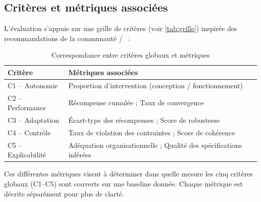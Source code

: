\subsection{Critères et métriques associées}\label{sec:criteria_metrics}

L'évaluation s'appuie sur une grille de critères (voir \autoref{tab:grille}) inspirée des recommandations de la communauté /~\cite{papoudakis2021agent} :

\begin{table}[h!]
  \centering
  \caption{Correspondance entre critères globaux et métriques}
  \renewcommand{\arraystretch}{1.2}
  \begin{tabular}{ll}
    \hline
    \textbf{Critère}    & \textbf{Métriques associées}                                       \\
    \hline
    C1 -- Autonomie     & Proportion d'intervention (conception / fonctionnement)            \\
    C2 -- Performance   & Récompense cumulée ; Taux de convergence                           \\
    C3 -- Adaptation    & Écart-type des récompenses ; Score de robustesse                   \\
    C4 -- Contrôle      & Taux de violation des contraintes ; Score de cohérence             \\
    C5 -- Explicabilité & Adéquation organisationnelle ; Qualité des spécifications inférées \\
    \hline
  \end{tabular}
  \label{tab:grille}
\end{table}

Ces différentes métriques visent à déterminer dans quelle mesure les cinq critères globaux (C1--C5) sont couverts sur une baseline donnée.
Chaque métrique est décrite séparément pour plus de clarté.

